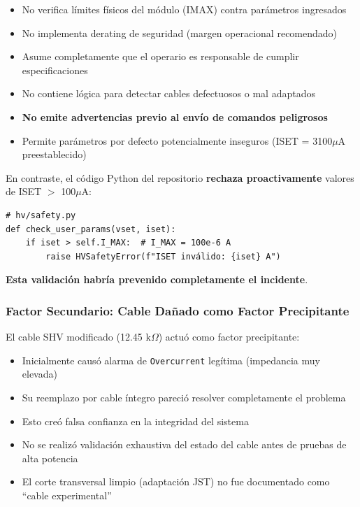 \documentclass{article}
\begin{document}
\begin{itemize}
    \item No verifica límites físicos del módulo (IMAX) contra parámetros ingresados
    \item No implementa derating de seguridad (margen operacional recomendado)
    \item Asume completamente que el operario es responsable de cumplir especificaciones
    \item No contiene lógica para detectar cables defectuosos o mal adaptados
    \item \textbf{No emite advertencias previo al envío de comandos peligrosos}
    \item Permite parámetros por defecto potencialmente inseguros (ISET = 3100\(\mu\)A preestablecido)
\end{itemize}

En contraste, el código Python del repositorio \textbf{rechaza proactivamente} valores de ISET $>$ 100\(\mu\)A:

\begin{lstlisting}
# hv/safety.py
def check_user_params(vset, iset):
    if iset > self.I_MAX:  # I_MAX = 100e-6 A
        raise HVSafetyError(f"ISET inválido: {iset} A")
\end{lstlisting}

\textbf{Esta validación habría prevenido completamente el incidente}.

\subsubsection{Factor Secundario: Cable Dañado como Factor Precipitante}

El cable SHV modificado (12.45 k\(\Omega\)) actuó como factor precipitante:

\begin{itemize}
    \item Inicialmente causó alarma de \texttt{Overcurrent} legítima (impedancia muy elevada)
    \item Su reemplazo por cable íntegro pareció resolver completamente el problema
    \item Esto creó falsa confianza en la integridad del sistema
    \item No se realizó validación exhaustiva del estado del cable antes de pruebas de alta potencia
    \item El corte transversal limpio (adaptación JST) no fue documentado como ``cable experimental''
\end{itemize}
\end{document}
